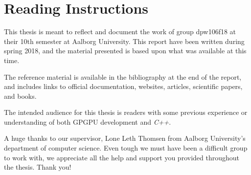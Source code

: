 \section*{Reading Instructions}
This thesis is meant to reflect and document the work of group dpw106f18 at their 10th semester at Aalborg University. This report have been written during spring 2018, and the material presented is based upon what was available at this time.

The reference material is available in the bibliography at the end of the report, and includes links to official documentation, websites, articles, scientific papers, and books. 

The intended audience for this thesis is readers with some previous experience or understanding of both GPGPU development and \textit{C++}.

A huge thanks to our supervisor, Lone Leth Thomsen from Aalborg University's department of computer science. Even tough we must have been a difficult group to work with, we appreciate all the help and support you provided throughout the thesis. Thank you!

